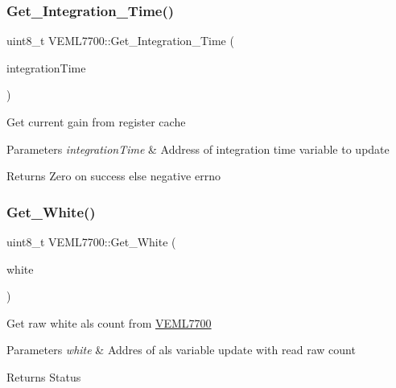 \subsubsection{\texorpdfstring{Get\+\_\+\+Integration\+\_\+\+Time()}{Get\_Integration\_Time()}}
{\footnotesize\ttfamily uint8\+\_\+t V\+E\+M\+L7700\+::\+Get\+\_\+\+Integration\+\_\+\+Time (\begin{DoxyParamCaption}\item[{\hyperlink{classVEML7700_a82e8b8f9960d8f80bc31dcfe7133ad6e}{A\+L\+S\+\_\+\+I\+N\+T\+E\+G\+R\+T\+A\+T\+I\+O\+N\+\_\+\+T\+I\+M\+E\+\_\+T} \&}]{integration\+Time }\end{DoxyParamCaption})}

Get current gain from register cache


\begin{DoxyParams}{Parameters}
{\em integration\+Time} & Address of integration time variable to update\\
\hline
\end{DoxyParams}
\begin{DoxyReturn}{Returns}
Zero on success else negative errno 
\end{DoxyReturn}
\mbox{\label{classVEML7700_aaee2f4b39b9391548ccb96bcdaebe2a0}} 
\subsubsection{\texorpdfstring{Get\+\_\+\+White()}{Get\_White()}}
{\footnotesize\ttfamily uint8\+\_\+t V\+E\+M\+L7700\+::\+Get\+\_\+\+White (\begin{DoxyParamCaption}\item[{uint16\+\_\+t \&}]{white }\end{DoxyParamCaption})\hspace{0.3cm}{\ttfamily [private]}}

Get raw white als count from \hyperlink{classVEML7700}{V\+E\+M\+L7700}


\begin{DoxyParams}{Parameters}
{\em white} & Addres of als variable update with read raw count\\
\hline
\end{DoxyParams}
\begin{DoxyReturn}{Returns}
Status 
\end{DoxyReturn}
\mbox{\label{classVEML7700_a0f046c3327cac02f34cf9bfe2ac1231b}} 

